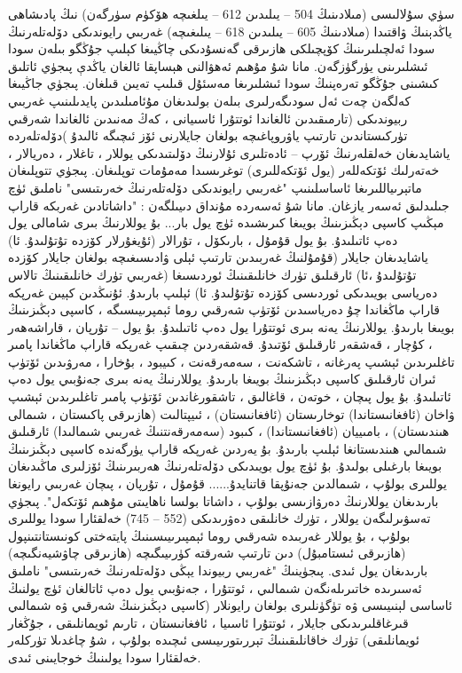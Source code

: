 \documentclass[a4paper]{article}
\begin{document}
سۈي سۇلالىسى (مىلادىنىڭ 504 – يىلىدىن 612 – يىلغىچە ھۆكۈم سۈرگەن) نىڭ پادىشاھى ياڭدېنىڭ ۋاقتىدا (مىلادىنىڭ 605 – يىلىدىن 618 – يىلىغىچە) غەربىي رايوندىكى دۆلەتلەرنىڭ سودا ئەلچىلىرىنىڭ كۆپچىلكى ھازىرقى گەنسۇدىكى چاڭيىغا كېلىپ جۇڭگو بىلەن سودا ئىشلىرىنى يۈرگۈزگەن. مانا شۇ مۇھىم ئەھۋالنى ھېساپقا ئالغان ياڭدې پىجۈي ئاتلىق كىشىنى جۇڭگو تەرەپنىڭ سودا ئىشلىرىغا مەسئۇل قىلىپ تەيىن قىلغان. پىجۈي جاڭيىغا كەلگەن چەت ئەل سودىگەرلىرى بىلەن بولىدىغان مۇئامىلىدىن پايدىلىنىپ غەربىي ربيوندىكى (تارمىقىدىن ئالغاندا ئوتتۇرا ئاسىيانى ، كەڭ مەنىدىن ئالغاندا شەرقىي تۈركىستاندىن تارتىپ ياۋروپاغىچە بولغان جايلارنى ئۆز ئىچىگە ئالىدۇ )دۆلەتلەردە ياشايدىغان خەلقلەرنىڭ ئۆرپ – ئادەتلىرى ئۇلارنىڭ دۆلىتىدىكى يوللار ، تاغلار ، دەريالار ، خەتەرلىك ئۆتكەللەر (يول ئۆتكەللىرى) توغرىسىدا مەمۇمات توپلىغان. پىجۈي تتوپلىغان ماتېرىياللىرىغا ئاساسلىنىپ "غەربىي رايوندىكى دۆلەتلەرنىڭ خەرىتىسى" ناملىق ئۈچ جىلىدلىق ئەسەر يازغان. مانا شۇ ئەسەردە مۇنداق دىيىلگەن : "داشاتادىن غەربكە قاراپ مېڭىپ كاسپى دېڭىزىنىڭ بويىغا كىرىشىدە ئۈچ يول بار... بۇ يوللارنىڭ بىرى شامالى يول دەپ ئاتىلىدۇ. بۇ يول قۇمۇل ، بارىكۆل ، تۇرالار (ئۇيغۇرلار كۆزدە تۇتۇلىدۇ. ئا) ياشايدىغان جايلار (قۇمۇلنىڭ غەربىدىن تارتىپ ئېلى ۋادىسىغىچە بولغان جايلار كۆزدە تۇتۇلىدۇ ،ئا) ئارقىلىق تۈرك خانلىقىنىڭ ئوردىسىغا (غەربىي تۈرك خانلىقىنىڭ تالاس دەرياسى بويىدىكى ئوردىسى كۆزدە تۇتۇلىدۇ. ئا) ئېلىپ بارىدۇ. ئۇنىڭدىن كېيىن غەرپكە قاراپ ماڭغاندا چۇ دەرياسىدىن ئۆتۈپ شەرقىي روما ئېمپرىيىسىگە ، كاسپى دېڭىزىنىڭ بويىغا بارىدۇ. يوللارنىڭ يەنە بىرى ئوتتۇرا يول دەپ ئاتىلىدۇ. بۇ يول – تۇرپان ، قاراشەھەر ، كۇچار ، قەشقەر ئارقىلىق ئۆتىدۇ. قەشقەردىن چىقىپ غەرپكە قاراپ ماڭغاندا پامىر تاغلىرىدىن ئېشىپ پەرغانە ، تاشكەنت ، سەمەرقەنت ، كىيبود ، بۇخارا ، مەرۋىدىن ئۆتۈپ ئىران ئارقىلىق كاسپى دېڭىزىنىڭ بويىغا بارىدۇ. يوللارنىڭ يەنە بىرى جەنۇبىي يول دەپ ئاتىلىدۇ. بۇ يول پىچان ، خوتەن ، قاغالىق ، تاشقورغاندىن ئۆتۈپ پامىر تاغلىرىدىن ئېشىپ ۋاخان (ئافغانىستاندا) توخارىستان (ئافغانىستان) ، ئىيپتالىت (ھازىرقى پاكىستان ، شىمالى ھىندىستان) ، بامىييان (ئافغانىستاندا) ، كىبود (سەمەرقەنتنىڭ غەربىي شىمالىدا) ئارقىلىق شىمالىي ھىندىستانغا ئېلىپ بارىدۇ. بۇ يەردىن غەرپكە قاراپ يۈرگەندە كاسپى دېڭىزىنىڭ بويىغا بارغىلى بولىدۇ. بۇ ئۈچ يول بويىدىكى دۆلەتلەرنىڭ ھەربىرىنىڭ ئۆزلىرى ماڭىدىغان يوللىرى بولۇپ ، شىمالدىن جەنۇپقا قاتنايدۇ...... قۇمۇل ، تۇرپان ، پىچان غەربىي رايونغا بارىدىغان يوللارنىڭ دەرۋازىسى بولۇپ ، داشاتا بولسا ناھايىتى مۇھىم ئۆتكەل". پىجۈي تەسۋىرلىگەن يوللار ، تۈرك خانلىقى دەۋرىدىكى (552 – 745) خەلقئارا سودا يوللىرى بولۇپ ، بۇ يوللار غەربىدە شەرقىي روما ئېمپىرىيىسىنىڭ پايتەختى كونىستانتىنپول (ھازىرقى ئىستامبۇل) دىن تارتىپ شەرقتە كۈرىيىگىچە (ھازىرقى چاۋشيەنگىچە) بارىدىغان يول ئىدى. پىجۈينىڭ "غەربىي ربيوندا يېڭى دۆلەتلەرنىڭ خەرىتىسى" ناملىق ئەسىرىدە خاتىرىلەنگەن شىمالىي ، ئوتتۇرا ، جەنۇبىي يول دەپ ئاتالغان ئۈچ يولنىڭ ئاساسى لېنىيىسى ۋە تۈگۈنلىرى بولغان رايونلار (كاسپى دېڭىزىنىڭ شەرقىي ۋە شىمالىي قىرغاقلىرىدىكى جايلار ، ئوتتۇرا ئاسىيا ، ئافغانىستان ، تارىم ئويمانلىقى ، جۇڭغار ئويمانلىقى) تۈرك خاقانلىقىنىڭ تېررىتورىيىسى ئىچىدە بولۇپ ، شۇ چاغدىلا تۈركلەر خەلقئارا سودا يولىنىڭ خوجايىنى ئىدى.
\end{document}
